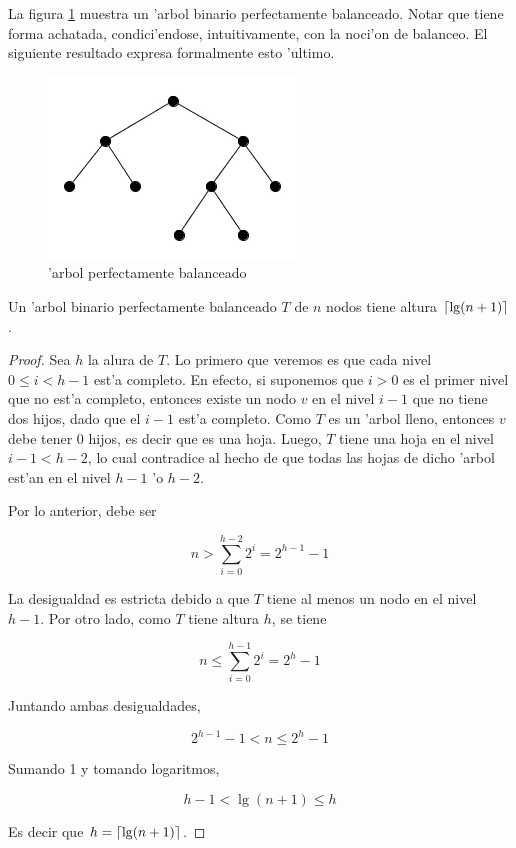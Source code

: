 La figura \ref{fig2} muestra un 'arbol binario perfectamente balanceado. Notar que tiene forma achatada, condici'endose, intuitivamente, con la noci'on de balanceo. El siguiente resultado expresa formalmente esto 'ultimo.

\begin{figure}[h]
	\begin{center}
	\includegraphics[scale=0.6]{imagenes/fig2.jpg}
	\end{center}
	\caption{'arbol perfectamente balanceado}
	\label{fig2}
\end{figure}

\begin{teo}
	Un 'arbol binario perfectamente balanceado $T$ de $n$ nodos tiene altura $\lceil\lg(n + 1)\rceil$.
\begin{proof}
	Sea $h$ la alura de $T$. Lo primero que veremos es que cada nivel $0 \leq i < h - 1$ est'a completo. En efecto, si suponemos que $i > 0$ es el primer nivel que no est'a completo, entonces existe un nodo $v$ en el nivel $i - 1$ que no tiene dos hijos, dado que el $i - 1$ est'a completo. Como $T$ es un 'arbol lleno, entonces $v$ debe tener 0 hijos, es decir que es una hoja. Luego, $T$ tiene una hoja en el nivel $i - 1 < h - 2$, lo cual contradice al hecho de que todas las hojas de dicho 'arbol est'an en el nivel $h - 1$ 'o $h - 2$.
	
	Por lo anterior, debe ser
	
	\[n > \sum_{i = 0}^{h - 2} 2^i = 2^{h - 1} - 1\]
	
	La desigualdad es estricta debido a que $T$ tiene al menos un nodo en el nivel $h - 1$.
	Por otro lado, como $T$ tiene altura $h$, se tiene
	
	\[n \leq \sum_{i = 0}^{h - 1} 2^i = 2^h - 1\]
	
	Juntando ambas desigualdades,
	
	\[2^{h - 1} - 1 < n \leq 2^h - 1\]
	
	Sumando 1 y tomando logaritmos,
	
	\[h - 1 < \lg(n + 1) \leq h\]
	
	Es decir que $h = \lceil\lg(n + 1)\rceil$.
	
\end{proof}
\end{teo}

